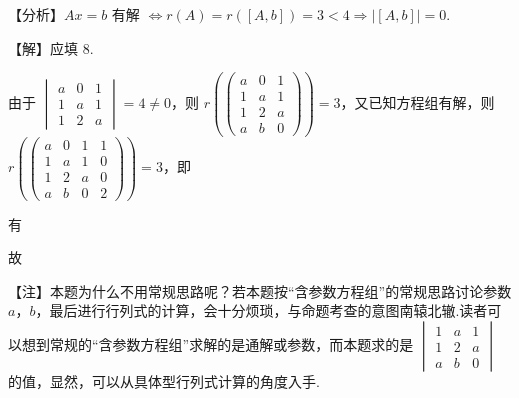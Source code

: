 【分析】$Ax=b$ 有解 $\Leftrightarrow r(A)=r([A,b])=3<4\Rightarrow|[A,b]|=0$.

【解】应填 8.

由于 $\begin{vmatrix}a&0&1\\1&a&1\\1&2&a\end{vmatrix}=4\ne0$，则 $r\left(\begin{pmatrix}a&0&1\\1&a&1\\1&2&a\\a&b&0\end{pmatrix}\right)=3$，又已知方程组有解，则 $r\left(\begin{pmatrix}a&0&1&1\\1&a&1&0\\1&2&a&0\\a&b&0&2\end{pmatrix}\right)=3$，即


有


故

\begin{fnote}
【注】本题为什么不用常规思路呢？若本题按“含参数方程组”的常规思路讨论参数 $a$，$b$，最后进行行列式的计算，会十分烦琐，与命题考查的意图南辕北辙.读者可以想到常规的“含参数方程组”求解的是通解或参数，而本题求的是 $\begin{vmatrix}1&a&1\\1&2&a\\a&b&0\end{vmatrix}$ 的值，显然，可以从具体型行列式计算的角度入手.
\end{fnote}

